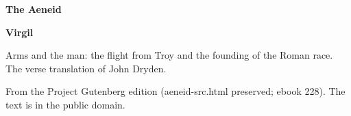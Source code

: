 \documentclass[11pt,letterpaper]{article}
\begin{document}
\color{ink}

\begin{titlepage}
\centering
\vspace*{4em}
{\LARGE\bfseries\color{heading} The Aeneid\par}
\vspace{2em}
{\Large\bfseries\color{heading} Virgil\par}
\vspace{2.5em}
{\itshape\color{subhead}\parbox{0.8\linewidth}{\centering Arms and the man: the flight from Troy and the founding of the Roman race. The verse translation of John Dryden.\par}}
\vfill
{\small From the Project Gutenberg edition (aeneid-src.html preserved; ebook 228). The text is in the public domain.\par}
\vspace{2em}
\end{titlepage}

\tableofcontents


\end{document}
